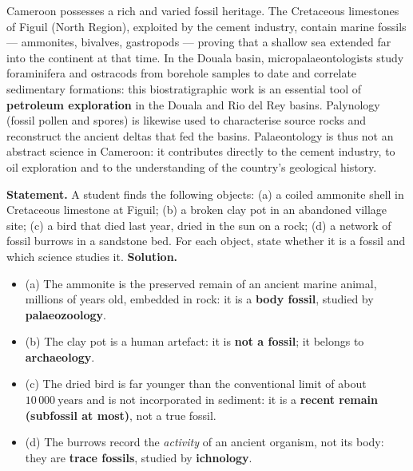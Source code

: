 \documentclass[11pt]{article}
\newcommand{\cle}[1]{{\popxbold\color{popdark}#1}}
\newcounter{popsec}
\newcounter{popsub}
\newcommand{\courssub}[1]{%
  \stepcounter{popsub}%
  \par\vspace{9pt}\noindent{\popxbold\fontsize{11.5}{13}\selectfont\color{popink}{\color{poporange}\thepopsec.\thepopsub}\hspace{6pt}#1}\par\nopagebreak\vspace{4pt}
}
\begin{document}
\courssub{Palaeontology in Cameroon}

\begin{savaistu}
Cameroon possesses a rich and varied fossil heritage. The Cretaceous limestones of \cle{Figuil} (North Region), exploited by the cement industry, contain marine fossils --- ammonites, bivalves, gastropods --- proving that a shallow sea extended far into the continent at that time. In the \cle{Douala basin}, micropalaeontologists study foraminifera and ostracods from borehole samples to date and correlate sedimentary formations: this biostratigraphic work is an essential tool of \textbf{petroleum exploration} in the Douala and Rio del Rey basins. Palynology (fossil pollen and spores) is likewise used to characterise source rocks and reconstruct the ancient deltas that fed the basins. Palaeontology is thus not an abstract science in Cameroon: it contributes directly to the cement industry, to oil exploration and to the understanding of the country's geological history.
\end{savaistu}

\begin{exoresolu}
\textbf{Statement.} A student finds the following objects: (a) a coiled ammonite shell in Cretaceous limestone at Figuil; (b) a broken clay pot in an abandoned village site; (c) a bird that died last year, dried in the sun on a rock; (d) a network of fossil burrows in a sandstone bed. For each object, state whether it is a fossil and which science studies it.
\tcblower
\textbf{Solution.}
\begin{itemize}
\item (a) The ammonite is the preserved remain of an ancient marine animal, millions of years old, embedded in rock: it is a \textbf{body fossil}, studied by \textbf{palaeozoology}.
\item (b) The clay pot is a human artefact: it is \textbf{not a fossil}; it belongs to \textbf{archaeology}.
\item (c) The dried bird is far younger than the conventional limit of about $10\,000\ \mathrm{years}$ and is not incorporated in sediment: it is a \textbf{recent remain (subfossil at most)}, not a true fossil.
\item (d) The burrows record the \emph{activity} of an ancient organism, not its body: they are \textbf{trace fossils}, studied by \textbf{ichnology}.
\end{itemize}
\end{exoresolu}
\end{document}
